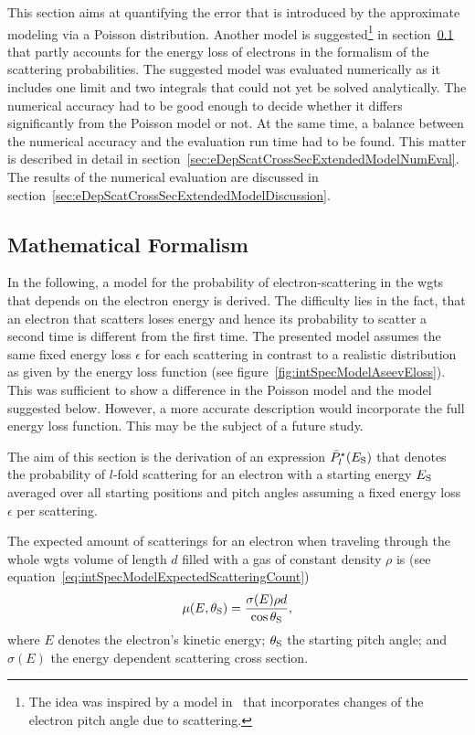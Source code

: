 This section aims at quantifying the error that is introduced by the approximate modeling via a Poisson distribution. Another model is suggested\footnote{The idea was inspired by a model in~\cite{Groh2015} that incorporates changes of the electron pitch angle due to scattering.} in section~\ref{sec:eDepScatCrossSecExtendedModelFormalism} that partly accounts for the energy loss of electrons in the formalism of the scattering probabilities. The suggested model was evaluated numerically as it includes one limit and two integrals that could not yet be solved analytically. The numerical accuracy had to be good enough to decide whether it differs significantly from the Poisson model or not. At the same time, a balance between the numerical accuracy and the evaluation run time had to be found. This matter is described in detail in section~\ref{sec:eDepScatCrossSecExtendedModelNumEval}. The results of the numerical evaluation are discussed in section~\ref{sec:eDepScatCrossSecExtendedModelDiscussion}.

\subsection{Mathematical Formalism}
\label{sec:eDepScatCrossSecExtendedModelFormalism}
In the following, a model for the probability of electron-scattering in the \gls{wgts} that depends on the electron energy is derived. The difficulty lies in the fact, that an electron that scatters loses energy and hence its probability to scatter a second time is different from the first time. The presented model assumes the same fixed energy loss $\epsilon$ for each scattering in contrast to a realistic distribution as given by the energy loss function (see figure~\ref{fig:intSpecModelAseevEloss}). This was sufficient to show a difference in the Poisson model and the model suggested below. However, a more accurate description would incorporate the full energy loss function. This may be the subject of a future study. 

The aim of this section is the derivation of an expression $\bar{P}^{\star}_l(E_\mathrm{S})$ that denotes the probability of $l$-fold scattering for an electron with a starting energy $E_\mathrm{S}$ averaged over all starting positions and pitch angles assuming a fixed energy loss $\epsilon$ per scattering.

The expected amount of scatterings for an electron when traveling through the whole \gls{wgts} volume of length $d$ filled with a gas of constant density $\rho$ is (see equation~\ref{eq:intSpecModelExpectedScatteringCount})
\begin{equation}
\mu(E,\theta_\mathrm{S}) =
\frac{\sigma(E)\rho d}{\cos\theta_\mathrm{S}},
\end{equation}
where $E$ denotes the electron's kinetic energy; $\theta_\mathrm{S}$ the starting pitch angle; and $\sigma(E)$ the energy dependent scattering cross section.

